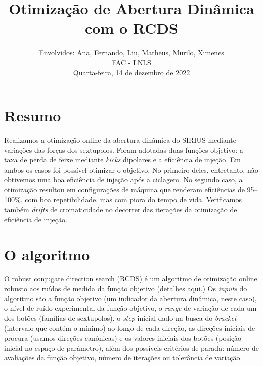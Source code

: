 \documentclass[a4paper,
               keeplastbox,   %
               ]{jacow}
\begin{document}
\title{Otimização de Abertura Dinâmica com o RCDS}

\author{Envolvidos: Ana, Fernando, Liu, Matheus, Murilo, Ximenes \\ FAC - LNLS \\ Quarta-feira, 14 de dezembro de 2022}
\maketitle
%
\section{Resumo}
Realizamos a otimização online da abertura dinâmica do SIRIUS mediante variações das forças dos sextupolos. Foram adotadas duas funções-objetivo: a taxa de perda de feixe mediante \textit{kicks} dipolares e a eficiência de injeção. Em ambos os casos foi possível otimizar o objetivo. No primeiro deles, entretanto, não obtivemos uma boa eficiência de injeção após a ciclagem. No segundo caso, a otimização resultou em configurações de máquina que renderam eficiências de 95--100\%, com boa repetibilidade, mas com piora do tempo de vida. Verificamos também \textit{drifts} de cromaticidade no decorrer das iterações da otimização de eficiência de injeção.
\section{O algoritmo}
O robust conjugate direction search (RCDS) é um algoritmo de otimização online robusto aos ruídos de medida da função objetivo (detalhes \href{https://www.slac.stanford.edu/pubs/slacpubs/15250/slac-pub-15414.pdf}{aqui}.)
Os \textit{inputs} do algoritmo são a função objetivo (um indicador da abertura dinâmica, neste caso), o nível de ruído experimental da função objetivo, o \textit{range} de variação de cada um dos botões (famílias de sextupolos), o \textit{step} inicial dado na busca do \textit{bracket} (intervalo que contém o mínimo) ao longo de cada direção, as direções iniciais de procura (usamos direções canônicas) e os valores iniciais dos botões (posição inicial no espaço de parâmetro), além dos possíveis critérios de parada: número de avaliações da função objetivo, número de iterações ou tolerância de variação.
\end{document}

